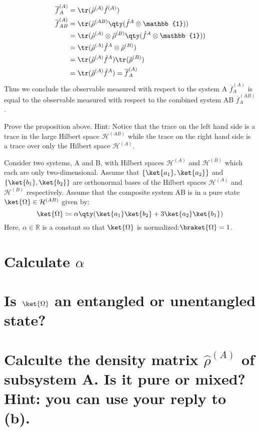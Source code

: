 \documentclass[boxes,pages]{homework}
\makeatletter
\newcommand{\hilb}{\mathcal{H}}
\numberwithin{@problem}{section}
\makeatother
\begin{document}
\begin{solution}
	\begin{align*}
		\overline{f}_A^{(A)}    & = \tr(\hat{\rho}^{(A)}\hat{f}^{(A)})                                             \\
		\overline{f}_{AB}^{(A)} & = \tr(\hat{\rho}^{(AB)}\qty(\hat{f}^{A}\otimes\mathbb{1}))                       \\
		                        & = \tr(\hat{\rho}^{(A)}\otimes\hat{\rho}^{(B)}\qty(\hat{f}^{A}\otimes\mathbb{1})) \\
		                        & = \tr(\hat{\rho}^{(A)}\hat{f}^{A}\otimes\hat{\rho}^{(B)})                        \\
		                        & = \tr(\hat{\rho}^{(A)}\hat{f}^{A})\tr(\hat{\rho}^{(B)})                          \\
		                        & = \tr(\hat{\rho}^{(A)}\hat{f}^{A}) = \overline{f}_A^{(A)}
	\end{align*}
	Thus we conclude the observable measured with respect to the system A $\overline{f}_A^{(A)}$ is equal to the observable measured with respect to the combined system AB $\overline{f}_A^{(AB)}$.
\end{solution}

\begin{problem}
Prove the proposition above. Hint: Notice that the trace on the left hand side is a trace in the large Hilbert space $\hilb^{(AB)}$ while the trace on the right hand side is a trace over only the Hilbert space $\hilb^{(A)}$.
\end{problem}

\begin{problem}
Consider two systems, A and B, with Hilbert spaces $\hilb^{(A)}$ and $\hilb^{(B)}$ which each are only two-dimensional. Assume that $\{\ket{a_1}, \ket{a_2}\}$ and $\{\ket{b_1}, \ket{b_2}\}$ are orthonormal bases of the Hilbert spaces $\hilb^{(A)}$ and $\hilb^{(B)}$ respectively. Assume that the composite system AB is in a pure state $\ket{\Omega}\in\hilb^{(AB)}$ given by:
\[
	\ket{\Omega}\coloneqq \alpha\qty(\ket{a_1}\ket{b_2} + 3\ket{a_2}\ket{b_1})
\]
Here, $\alpha\in\mathbb{R}$ is a constant so that $\ket{\Omega}$ is normalized:$\braket{\Omega} = 1$.
\begin{parts}
	\part{Calculate $\alpha$}\label{part:13a}
	\part{Is $\ket{\Omega}$ an entangled or unentangled state?}\label{part:13b}
	\part{Calculte the density matrix $\hat{\rho}^{(A)}$ of subsystem A. Is it pure or mixed? Hint: you can use your reply to (b).}\label{part:13c}
\end{parts}
\end{problem}
\end{document}
